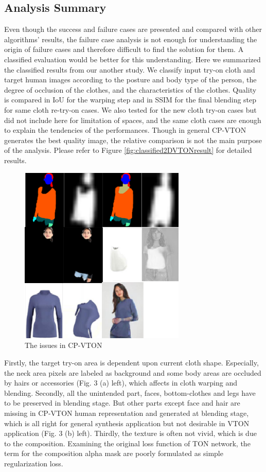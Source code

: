 \documentclass[runningheads]{llncs}
\begin{document}
 
\subsection{Analysis Summary}


Even though the success and failure cases are presented and compared with other algorithms' results, the failure case analysis is not enough for understanding the origin of failure cases and therefore difficult to find the solution for them. A classified evaluation would be better for this understanding. Here we summarized the classified results from our another study. We classify input try-on cloth and target human images according to the posture and body type of the person, the degree of occlusion of the clothes, and the characteristics of the clothes. Quality is compared in IoU for the warping step and in SSIM for the final blending step for same cloth re-try-on cases. We also tested for the new cloth try-on cases but did not include here for limitation of spaces, and the same cloth cases are enough to explain the tendencies of the performances. Though in general CP-VTON generates the best quality image, the relative comparison is not the main purpose of the analysis. Please refer to Figure \ref{fig:classified2DVTONresult} for detailed results.


\begin{figure}
\centering
\includegraphics[height=8.5cm, scale=1]{figures/cpvtonissues.png}   %
\caption{The issues in CP-VTON}
\label{fig:cpvtonissues}
\end{figure}


Firstly, the target try-on area is dependent upon current cloth shape. Especially, the neck area pixels are labeled as background and some body areas are occluded by hairs or accessories (Fig. 3 (a) left), which affects in cloth warping and blending. Secondly, all the unintended part, faces, bottom-clothes and legs have to be preserved in blending stage. But other parts except face and hair are missing in CP-VTON\cite{Wang2018TowardCI} human representation and generated at blending stage, which is all right for general synthesis application but not desirable in VTON application (Fig. 3 (b) left). Thirdly, the texture is often not vivid, which is due to the composition. Examining the original loss function of TON network, the term for the composition alpha mask are poorly formulated as simple regularization loss.   
\end{document}

